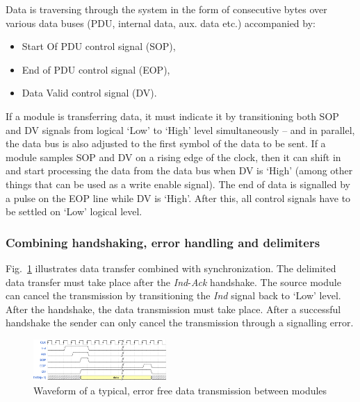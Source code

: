 \documentclass[journal]{IEEEtran}
\begin{document}
Data is traversing through the system in the form of consecutive bytes over various data buses (PDU, internal data,
aux. data etc.) accompanied by:
\begin{itemize}
    \renewcommand \labelitemi{--}
    \item Start Of PDU control signal (SOP),
    \item End of PDU control signal (EOP),
    \item Data Valid control signal (DV).
\end{itemize}
If a module is transferring data, it must indicate it by transitioning both SOP and DV signals from logical `Low' to
`High' level simultaneously -- and in parallel, the data bus is also adjusted to the first symbol of the data to be
sent.
If a module samples SOP and DV on a rising edge of the clock, then it can shift in and start processing the data from
the data bus when DV is `High' (among other things that can be used as a write enable signal).
The end of data is signalled by a pulse on the EOP line while DV is `High'. After this, all control signals have to be
settled on `Low' logical level.

\subsubsection{Combining handshaking, error handling and delimiters}

Fig.~\ref{fig:data_signals} illustrates data transfer combined with synchronization. The delimited data transfer must
take place after the \emph{Ind}-\emph{Ack} handshake.
The source module can cancel the transmission by transitioning the \emph{Ind} signal back to `Low' level. After the
handshake, the data transmission must take place. After a successful handshake the sender can only cancel the
transmission through a signalling error.

\begin{figure}[!htb]
    \centering
    \includegraphics[width=0.45\textwidth]{figures_raw/data_signals.png}
    \caption{Waveform of a typical, error free data transmission between modules}
    \label{fig:data_signals}
\end{figure}
\end{document}
